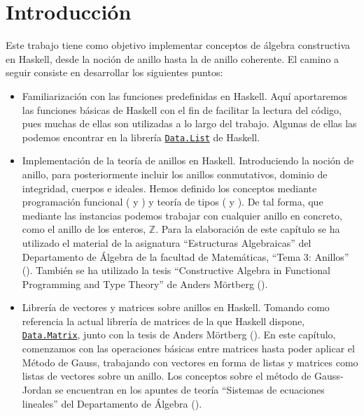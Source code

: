 \label{sec:introHas}
\chapter*{Introducción}

Este trabajo tiene como objetivo implementar conceptos de álgebra constructiva en Haskell, desde la noción de anillo hasta la de anillo coherente. El camino a seguir consiste en desarrollar los siguientes puntos:
\begin{itemize}
\item Familiarización con las funciones predefinidas en Haskell. Aquí aportaremos las funciones básicas de Haskell con el fin de facilitar la lectura del código, pues muchas de ellas son utilizadas a lo largo del trabajo. Algunas de ellas las podemos encontrar en la librería \href{http://hackage.haskell.org/package/base-4.11.1.0/docs/Data-List.html}{\texttt{Data.List}}  de Haskell.

\item Implementación de la teoría de anillos en Haskell. Introduciendo la noción de anillo, para posteriormente incluir los anillos conmutativos, dominio de integridad, cuerpos e ideales. Hemos definido los conceptos mediante programación funcional (\cite{Alonso-15b} y \cite{Hutton-16}) y teoría de tipos (\cite{Alonso-16a} y \cite{aprendehaskell}). De tal forma, que mediante las instancias podemos trabajar con cualquier anillo en concreto, como el anillo de los enteros, $\mathbb{Z}$. Para la elaboración de este capítulo se ha utilizado el material de la asignatura ``Estructuras Algebraicas'' del Departamento de Álgebra de la facultad de Matemáticas, ``Tema 3: Anillos'' (\cite{Algebra-15}). También se ha utilizado la tesis ``Constructive Algebra in Functional Programming and Type Theory'' de Anders Mörtberg (\cite{tesis}).

\item Librería de vectores y matrices sobre anillos en Haskell. Tomando como referencia la actual librería de matrices de la que Haskell dispone, \href{https://hackage.haskell.org/package/matrix-0.3.6.1/docs/Data-Matrix.html}{\texttt{Data.Matrix}}, junto con la tesis de Anders Mörtberg (\cite{tesis}). En este capítulo, comenzamos con las operaciones básicas entre matrices hasta poder aplicar el Método de Gauss, trabajando con vectores en forma de listas y matrices como listas de vectores sobre un anillo. Los conceptos sobre el método de Gauss-Jordan se encuentran en los apuntes de teoría ``Sistemas de ecuaciones lineales'' del Departamento de Álgebra (\cite{gauss}).


\end{itemize}
